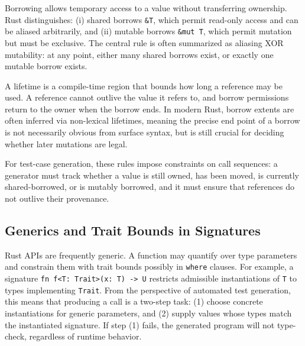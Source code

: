 \documentclass[sigconf]{acmart}
\begin{document}
Borrowing allows temporary access to a value without transferring ownership.
Rust distinguishes:
(i) shared borrows \texttt{\&T}, which permit read-only access and can be aliased arbitrarily, and
(ii) mutable borrows \texttt{\&mut T}, which permit mutation but must be exclusive.
The central rule is often summarized as aliasing XOR mutability:
at any point, either many shared borrows exist, or exactly one mutable borrow exists.

A lifetime is a compile-time region that bounds how long a reference may be used. A reference cannot outlive the value it refers to, and borrow permissions return to the owner when the borrow ends.
In modern Rust, borrow extents are often inferred via non-lexical lifetimes, meaning the precise end point of a borrow is not necessarily obvious from surface syntax, but is still crucial for deciding whether later mutations are legal.

For test-case generation, these rules impose constraints on call sequences: a generator must track whether a value is still owned, has been moved, is currently shared-borrowed, or is mutably borrowed, and it must ensure that references do not outlive their provenance.

\subsection{Generics and Trait Bounds in Signatures}
\label{sec:background:generics}
Rust APIs are frequently generic.
A function may quantify over type parameters and constrain them with trait bounds possibly in \texttt{where} clauses.
For example, a signature \texttt{fn f<T: Trait>(x: T) -> U} restricts admissible instantiations of \texttt{T} to types implementing \texttt{Trait}.
From the perspective of automated test generation, this means that producing a call is a two-step task:
(1) choose concrete instantiations for generic parameters, and
(2) supply values whose types match the instantiated signature.
If step (1) fails, the generated program will not type-check, regardless of runtime behavior.
\end{document}
